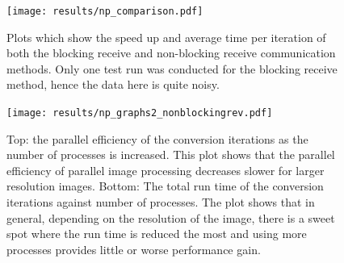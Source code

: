 \documentclass[11pt, a4paper]{article}
\begin{document}
		\begin{figure}[!ht]
			\centering
			\texttt{[image: results/np\_comparison.pdf]}
			\caption{Plots which show the speed up and average time per iteration of both the blocking receive and non-blocking receive communication methods. Only one test run was conducted for the blocking receive method, hence the data here is quite noisy.}
			\label{fig:comparison}
		\end{figure}	

		\newpage
		\begin{figure}[!ht]
			\centering
			\texttt{[image: results/np\_graphs2\_nonblockingrev.pdf]}
			\caption{Top: the parallel efficiency of the conversion iterations as the number of processes is increased. This plot shows that the parallel efficiency of parallel image processing decreases slower for larger resolution images. Bottom: The total run time of the conversion iterations against number of processes. The plot shows that in general, depending on the resolution of the image, there is a sweet spot where the run time is reduced the most and using more processes provides little or worse performance gain.}
			\label{fig:np_runtime2}
		\end{figure}
	
\end{document}
